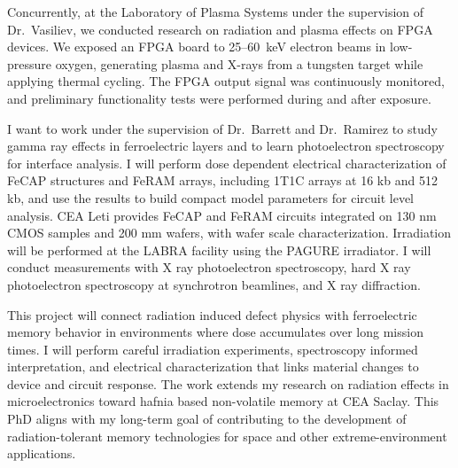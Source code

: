 \documentclass[a4paper,12pt]{article}
\begin{document}
Concurrently, at the Laboratory of Plasma Systems under the supervision of Dr.\ Vasiliev, we conducted research on radiation and plasma effects on FPGA devices. We exposed an FPGA board to 25--60~keV electron beams in low-pressure oxygen, generating plasma and X-rays from a tungsten target while applying thermal cycling. The FPGA output signal was continuously monitored, and preliminary functionality tests were performed during and after exposure.

I want to work under the supervision of Dr.\ Barrett and Dr.\ Ramirez to study gamma ray effects in  ferroelectric layers and to learn photoelectron spectroscopy for interface analysis. I will perform dose dependent electrical characterization of FeCAP structures and FeRAM arrays, including 1T1C arrays at 16 kb and 512 kb, and use the results to build compact model parameters for circuit level analysis. CEA Leti provides FeCAP and FeRAM circuits integrated on 130 nm CMOS samples and 200 mm wafers, with wafer scale characterization. Irradiation will be performed at the LABRA facility using the PAGURE irradiator. I will conduct measurements with X ray photoelectron spectroscopy, hard X ray photoelectron spectroscopy at synchrotron beamlines, and X ray diffraction.

This project will connect radiation induced defect physics with ferroelectric memory behavior in environments where dose accumulates over long mission times. I will perform careful irradiation experiments, spectroscopy informed interpretation, and electrical characterization that links material changes to device and circuit response. The work extends my research on radiation effects in microelectronics toward hafnia based non-volatile memory at CEA Saclay. This PhD aligns with my long-term goal of contributing to the development of radiation-tolerant memory technologies for space and other extreme-environment
applications.
\end{document}
